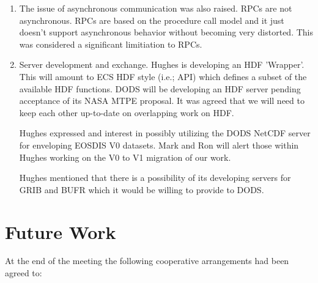 \begin{enumerate}
   \item The issue of asynchronous communication was also raised.
   RPCs are not asynchronous. RPCs are based on the procedure call model
   and it just doesn't support asynchronous behavior without becoming
   very distorted.  This was considered a significant limitiation to RPCs.


   \item  Server development and exchange.  Hughes is developing an HDF
   'Wrapper'.  This will amount to ECS HDF style (i.e.; API) which defines a
   subset of the available HDF functions.  DODS will be developing an HDF
   server pending  acceptance of its NASA MTPE proposal.  It was agreed that
   we will need to keep each other up-to-date on overlapping work on HDF.  

   Hughes expressed and interest in possibly utilizing the DODS NetCDF server
   for enveloping EOSDIS V0 datasets.  Mark and Ron will alert those within
   Hughes working on the V0 to V1 migration of our work.

   Hughes mentioned that there is a possibility of its developing servers for
   GRIB and BUFR which it would be willing to provide to DODS.


\end{enumerate}


\section{Future Work}

	At the end of the meeting the following cooperative
arrangements had been agreed to:


